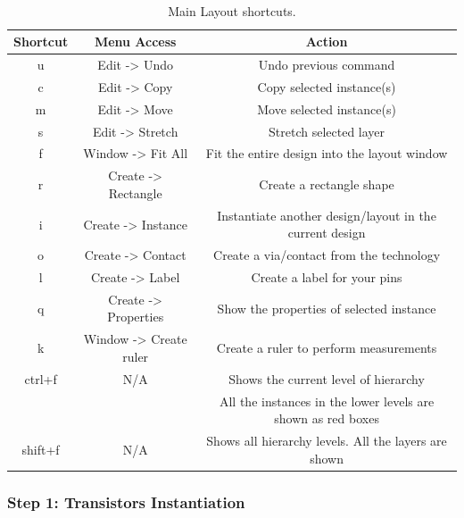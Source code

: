 \begin{enumerate}
	\begin{table}[h!]
		\caption{Main Layout\textsuperscript{\tiny\textregistered} shortcuts.}
				\vspace{-2mm}
		\label{shortcuts}
		\centering
		\begin{tabular}{ |c| c|c| }
			\hline
			\textbf{Shortcut} & \textbf{Menu Access} &\textbf{Action}  \\ 
			\hline
			u & Edit -> Undo & Undo previous command \\  
			\hline
					c & Edit -> Copy & Copy selected instance(s)  \\  
			\hline
					m & Edit -> Move & Move selected instance(s)  \\  
			\hline
								s & Edit -> Stretch & Stretch selected layer  \\  
			\hline
			f & Window -> Fit All & Fit the entire design into the layout window  \\  
			\hline
			r & Create -> Rectangle & Create a rectangle shape  \\  
\hline
			i & Create -> Instance & Instantiate another design/layout in the current design  \\  
\hline
		o & Create -> Contact & Create a via/contact from the technology  \\  
\hline
		l & Create -> Label & Create a label for your pins  \\  
\hline
		q & Create -> Properties & Show the properties of selected instance  \\  
\hline
		k & Window -> Create ruler & Create a ruler to perform measurements  \\  
\hline
		ctrl+f & N/A & Shows the current level of hierarchy\\  
				& & All the instances in the lower levels are shown as red boxes  \\  
\hline
		shift+f & N/A & Shows all hierarchy levels. All the layers are shown  \\  
\hline
		\end{tabular}
	\end{table}
\end{enumerate}

\subsubsection*{Step 1: Transistors Instantiation}

